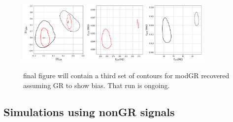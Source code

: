 \documentclass[twocolumn,prd,superscriptaddress,amsfonts,amssymb,amsmath,preprintnumbers]{revtex4-1}
\newcommand{\abhi}[1]{\textcolor{red}{[\textit{AG: #1}]}}
\begin{document}
\begin{figure}[h]
	\includegraphics[width=0.3\textwidth]{figures/GW150914_GW190521_simulated_frac.png}\includegraphics[width=0.56\textwidth]{figures/GW150914_GW190521_simulated_abs.png}\label{fig:gr_simulation}
	\caption{final figure will contain a third set of contours for modGR recovered assuming GR to show bias. That run is ongoing.}
\end{figure}

\subsection{Simulations using nonGR signals}
\end{document}
